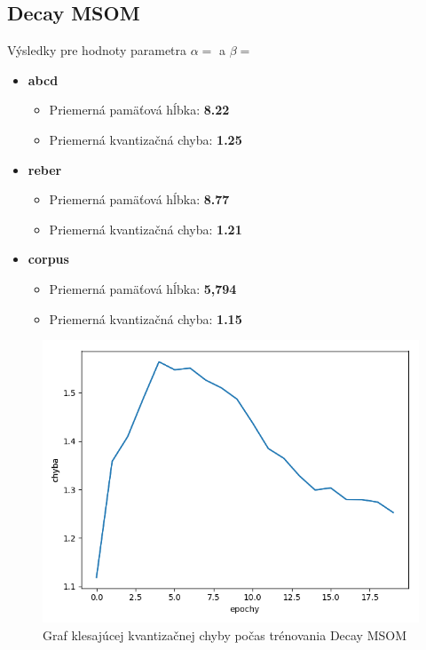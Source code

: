 \subsection{Decay MSOM}
Výsledky pre hodnoty parametra $\alpha = $ a $\beta = $
\begin{itemize}
    \item \textbf{abcd}
    \begin{itemize}
        \item Priemerná pamäťová hĺbka: \textbf{8.22}
        \item Priemerná kvantizačná chyba: \textbf{1.25}
    \end{itemize}
    \item \textbf{reber}
    \begin{itemize}
        \item Priemerná pamäťová hĺbka: \textbf{8.77}
        \item Priemerná kvantizačná chyba: \textbf{1.21}    
    \end{itemize}
    \item \textbf{corpus}
    \begin{itemize}
        \item Priemerná pamäťová hĺbka: \textbf{5,794}
        \item Priemerná kvantizačná chyba: \textbf{1.15}
    \end{itemize}
\end{itemize}

\begin{figure}[H]
    \centering
    \includegraphics[width=\textwidth]{assets/dm_error_top}
    \caption{Graf klesajúcej kvantizačnej chyby počas trénovania Decay MSOM}
\end{figure}



